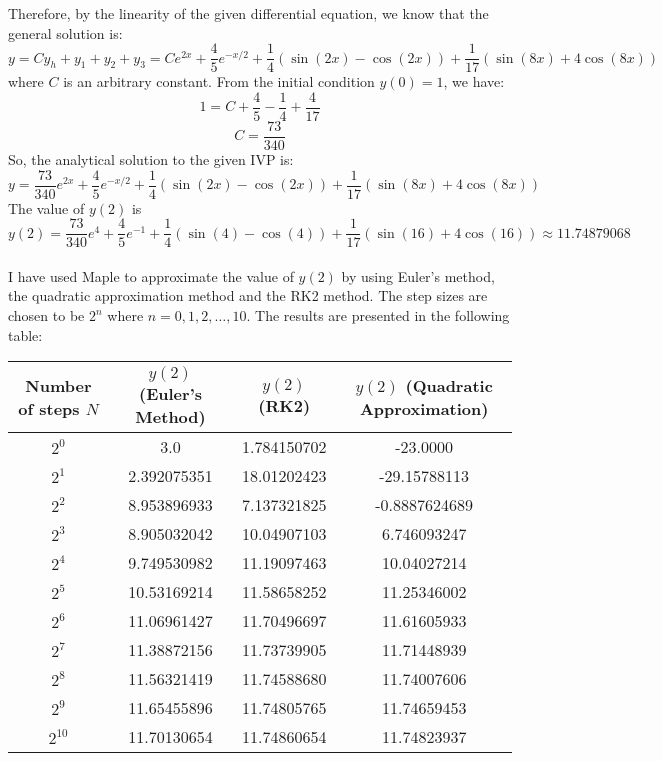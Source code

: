 \documentclass{article}
\begin{document}
Therefore, by the linearity of the given differential equation, we know that the general solution is:
\begin{equation}
  y = Cy_h + y_1 + y_2 +y_3 = Ce^{2x} +  \frac{4}{5} e^{-x/2} + \frac{1}{4}(\sin(2x)-\cos(2x)) + \frac{1}{17}(\sin(8x) + 4\cos(8x))
\end{equation}
where \(C\) is an arbitrary constant. From the initial condition \(y(0)=1\), we have:
\begin{equation}
  1 = C + \frac{4}{5} - \frac{1}{4} + \frac{4}{17}
\end{equation}
\begin{equation}
  C = \frac{73}{340}
\end{equation}
So, the analytical solution to the given IVP is:
\begin{equation}
  y = \frac{73}{340}e^{2x} +  \frac{4}{5} e^{-x/2} + \frac{1}{4}(\sin(2x)-\cos(2x)) + \frac{1}{17}(\sin(8x) + 4\cos(8x))
\end{equation}
The value of \(y(2)\) is
\begin{equation}
  y(2) = \frac{73}{340}e^{4} + \frac{4}{5} e^{-1} + \frac{1}{4}(\sin(4)-\cos(4)) + \frac{1}{17}(\sin(16) + 4\cos(16))
  \approx 11.74879068
\end{equation}
\\
I have used Maple to approximate the value of \(y(2)\) by using Euler's method, the quadratic approximation method and the
RK2 method. The step sizes are chosen to be \(2^n\) where \(n = 0,1,2,\ldots, 10\). The results are presented in the
following table:
\begin{center}
\begin{tabular}{||c |c| c| c||}
 \hline
  Number of steps \(N\) & \(y(2)\) (Euler's Method) & \(y(2)\) (RK2) & \(y(2)\) (Quadratic Approximation) \\ [0.5ex]
 \hline\hline
 \(2^0\) & 3.0 & 1.784150702 & -23.0000 \\
 \hline
 \(2^1\) & 2.392075351 & 18.01202423 & -29.15788113 \\
 \hline
 \(2^2\) & 8.953896933 & 7.137321825 & -0.8887624689 \\
 \hline
 \(2^3\) & 8.905032042 & 10.04907103 & 6.746093247\\
 \hline
 \(2^4\) & 9.749530982 & 11.19097463 & 10.04027214 \\
 \hline
 \(2^5\) & 10.53169214 & 11.58658252 & 11.25346002 \\
 \hline
 \(2^6\) & 11.06961427 & 11.70496697 & 11.61605933 \\
 \hline
 \(2^7\) & 11.38872156 & 11.73739905 & 11.71448939 \\
 \hline
 \(2^8\) & 11.56321419 & 11.74588680 & 11.74007606 \\
 \hline
 \(2^9\) & 11.65455896 & 11.74805765 & 11.74659453 \\
 \hline
 \(2^{10}\) & 11.70130654 & 11.74860654 & 11.74823937 \\
 \hline
\end{tabular}
\end{center}
\end{document}

